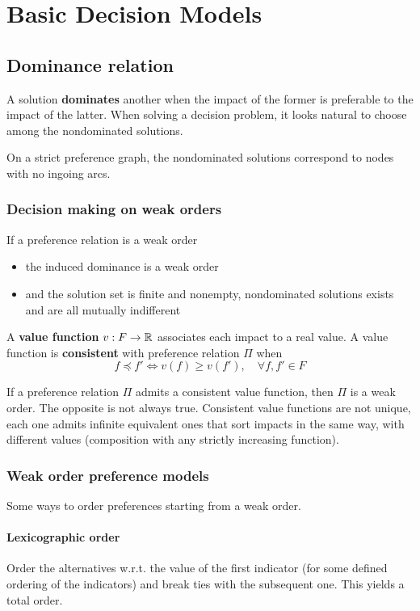 \section{Basic Decision Models}

\subsection{Dominance relation}

A solution \textbf{dominates} another when the impact of the former is preferable to the impact of the latter. When solving a decision problem, it looks natural to choose among the nondominated solutions. 

On a strict preference graph, the nondominated solutions correspond to nodes with no ingoing arcs. 

\subsubsection{Decision making on weak orders}

If a preference relation is a weak order
\begin{itemize}
	\item the induced dominance is a weak order
	
	\item and the solution set is finite and nonempty, nondominated solutions exists and are all mutually indifferent
\end{itemize}

A \textbf{value function} $v: F \rightarrow \operatorname{\mathbb{R}}$ associates each impact to a real value. A value function is \textbf{consistent} with preference relation $\Pi$ when 
$$ f \preceq f' \Leftrightarrow v(f) \geq v(f'), \quad \forall f,f' \in F$$

If a preference relation $\Pi$ admits a consistent value function, then $\Pi$ is a weak order. The opposite is not always true. Consistent value functions are not unique, each one admits infinite equivalent ones that sort impacts in the same way, with different values (composition with any strictly increasing function).

\subsubsection{Weak order preference models}

Some ways to order preferences starting from a weak order.

\paragraph{Lexicographic order} Order the alternatives w.r.t. the value of the first indicator (for some defined ordering of the indicators) and break ties with the subsequent one. This yields a total order.

